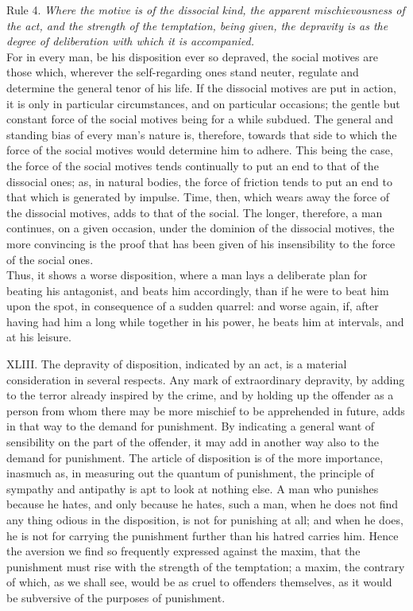 \documentclass[12pt]{report}
\begin{document}
Rule 4. \emph{Where the motive is of the dissocial kind, the apparent
mischievousness of the act, and the strength of the temptation, being
given, the depravity is as the degree of deliberation with which it is
accompanied.}\\
For in every man, be his disposition ever so depraved, the social
motives are those which, wherever the self-regarding ones stand neuter,
regulate and determine the general tenor of his life. If the dissocial
motives are put in action, it is only in particular circumstances, and
on particular occasions; the gentle but constant force of the social
motives being for a while subdued. The general and standing bias of
every man's nature is, therefore, towards that side to which the force
of the social motives would determine him to adhere. This being the
case, the force of the social motives tends continually to put an end to
that of the dissocial ones; as, in natural bodies, the force of friction
tends to put an end to that which is generated by impulse. Time, then,
which wears away the force of the dissocial motives, adds to that of the
social. The longer, therefore, a man continues, on a given occasion,
under the dominion of the dissocial motives, the more convincing is the
proof that has been given of his insensibility to the force of the
social ones.\\
Thus, it shows a worse disposition, where a man lays a deliberate plan
for beating his antagonist, and beats him accordingly, than if he were
to beat him upon the spot, in consequence of a sudden quarrel: and worse
again, if, after having had him a long while together in his power, he
beats him at intervals, and at his leisure.

XLIII. The depravity of disposition, indicated by an act, is a material
consideration in several respects. Any mark of extraordinary depravity,
by adding to the terror already inspired by the crime, and by holding up
the offender as a person from whom there may be more mischief to be
apprehended in future, adds in that way to the demand for punishment. By
indicating a general want of sensibility on the part of the offender, it
may add in another way also to the demand for punishment. The article of
disposition is of the more importance, inasmuch as, in measuring out the
quantum of punishment, the principle of sympathy and antipathy is apt to
look at nothing else. A man who punishes because he hates, and only
because he hates, such a man, when he does not find any thing odious in
the disposition, is not for punishing at all; and when he does, he is
not for carrying the punishment further than his hatred carries him.
Hence the aversion we find so frequently expressed against the maxim,
that the punishment must rise with the strength of the temptation; a
maxim, the contrary of which, as we shall see, would be as cruel to
offenders themselves, as it would be subversive of the purposes of
punishment.
\end{document}
